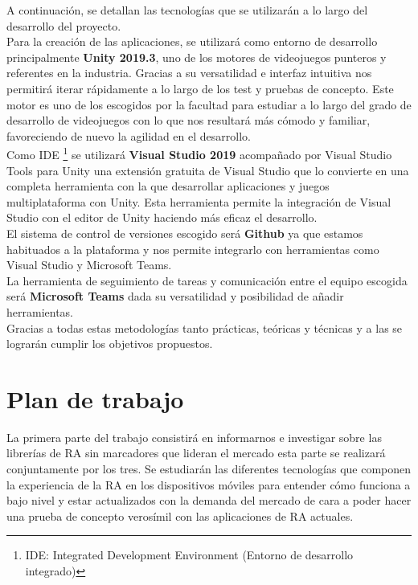 A continuación, se detallan las tecnologías que se utilizarán a lo largo del desarrollo del proyecto.\\

Para la creación de las aplicaciones, se utilizará como entorno de desarrollo principalmente \textbf{Unity 2019.3}, uno de los motores de videojuegos punteros y referentes en la industria. Gracias a su versatilidad e interfaz intuitiva nos permitirá iterar rápidamente a lo largo de los test y pruebas de concepto. Este motor es uno de los escogidos por la facultad para estudiar a lo largo del grado de desarrollo de videojuegos con lo que nos resultará más cómodo y familiar, favoreciendo de nuevo la agilidad en el desarrollo.\\

Como IDE \footnote{IDE: Integrated Development Environment (Entorno de desarrollo integrado)}  se utilizará \textbf{Visual Studio 2019} acompañado por Visual Studio Tools para Unity una extensión gratuita de Visual Studio que lo convierte en una completa herramienta con la que desarrollar aplicaciones y juegos multiplataforma con Unity. Esta herramienta permite la integración de Visual Studio con el editor de Unity haciendo más eficaz el desarrollo.\\
El sistema de control de versiones escogido será \textbf{Github} ya que estamos habituados a la plataforma y nos permite integrarlo con herramientas como Visual Studio y Microsoft Teams.\\

La herramienta de seguimiento de tareas y comunicación entre el equipo escogida será \textbf{Microsoft Teams} dada su versatilidad y posibilidad de añadir herramientas.\\

Gracias a todas estas metodologías tanto prácticas, teóricas y técnicas y a las se lograrán cumplir los objetivos propuestos.\\

\section{Plan de trabajo}
La primera parte del trabajo consistirá en informarnos e investigar sobre las librerías de RA sin marcadores que lideran el mercado esta parte se realizará conjuntamente por los tres. Se estudiarán las diferentes tecnologías que componen la experiencia de la RA en los dispositivos móviles para entender cómo funciona a bajo nivel y estar actualizados con la demanda del mercado de cara a poder hacer una prueba de concepto verosímil con las aplicaciones de RA actuales. \\

